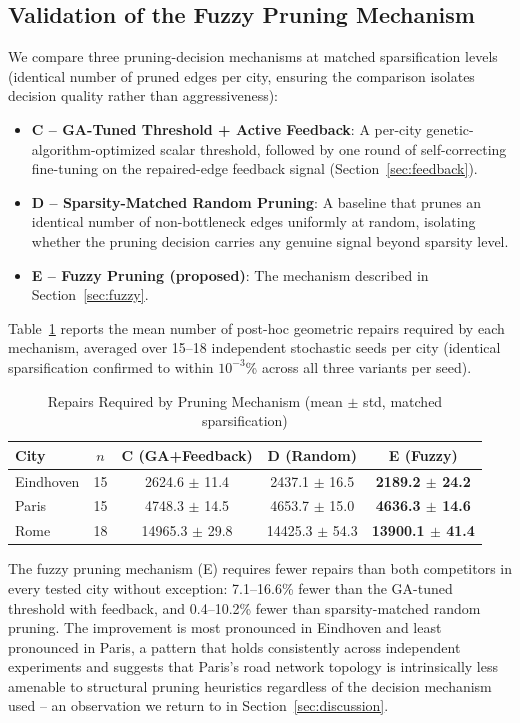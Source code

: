 \documentclass[journal]{IEEEtran}
\begin{document}
\subsection{Validation of the Fuzzy Pruning Mechanism}
\label{sec:fuzzy-results}
 
We compare three pruning-decision mechanisms at matched sparsification levels (identical number of pruned edges per city, ensuring the comparison isolates decision quality rather than aggressiveness):
\begin{itemize}
    \item \textbf{C -- GA-Tuned Threshold + Active Feedback}: A per-city genetic-algorithm-optimized scalar threshold, followed by one round of self-correcting fine-tuning on the repaired-edge feedback signal (Section~\ref{sec:feedback}).
    \item \textbf{D -- Sparsity-Matched Random Pruning}: A baseline that prunes an identical number of non-bottleneck edges uniformly at random, isolating whether the pruning decision carries any genuine signal beyond sparsity level.
    \item \textbf{E -- Fuzzy Pruning (proposed)}: The mechanism described in Section~\ref{sec:fuzzy}.
\end{itemize}
 
Table~\ref{tab:fuzzy-results} reports the mean number of post-hoc geometric repairs required by each mechanism, averaged over 15--18 independent stochastic seeds per city (identical sparsification confirmed to within $10^{-3}$\% across all three variants per seed).
 
\begin{table}[h]
\centering
\caption{Repairs Required by Pruning Mechanism (mean $\pm$ std, matched sparsification)}
\begin{tabular}{lcccc}
\toprule
City & $n$ & C (GA+Feedback) & D (Random) & \textbf{E (Fuzzy)} \\
\midrule
Eindhoven & 15 & 2624.6 $\pm$ 11.4 & 2437.1 $\pm$ 16.5 & \textbf{2189.2 $\pm$ 24.2} \\
Paris     & 15 & 4748.3 $\pm$ 14.5 & 4653.7 $\pm$ 15.0 & \textbf{4636.3 $\pm$ 14.6} \\
Rome      & 18 & 14965.3 $\pm$ 29.8 & 14425.3 $\pm$ 54.3 & \textbf{13900.1 $\pm$ 41.4} \\
\bottomrule
\end{tabular}
\label{tab:fuzzy-results}
\end{table}
 
The fuzzy pruning mechanism (E) requires fewer repairs than both competitors in every tested city without exception: 7.1--16.6\% fewer than the GA-tuned threshold with feedback, and 0.4--10.2\% fewer than sparsity-matched random pruning. The improvement is most pronounced in Eindhoven and least pronounced in Paris, a pattern that holds consistently across independent experiments and suggests that Paris's road network topology is intrinsically less amenable to structural pruning heuristics regardless of the decision mechanism used -- an observation we return to in Section~\ref{sec:discussion}.
 
\end{document}

